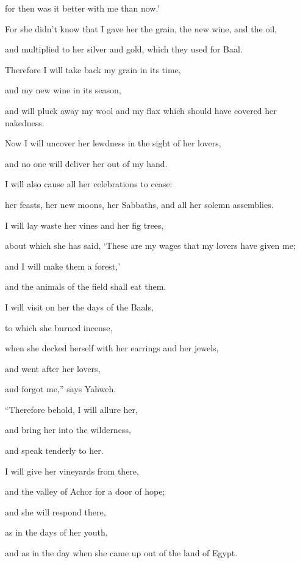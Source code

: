 {\par }{\QB for then was it better with me than now.’
\par }{\Q {}For she didn’t know that I gave her the grain, the new wine, and the oil,
\par }{\QB and multiplied to her silver and gold, which they used for Baal.
\par }{\Q {}Therefore I will take back my grain in its time,
\par }{\QB and my new wine in its season,
\par }{\QB and will pluck away my wool and my flax which should have covered her nakedness.
\par }{\Q {}Now I will uncover her lewdness in the sight of her lovers,
\par }{\QB and no one will deliver her out of my hand.
\par }{\Q {}I will also cause all her celebrations to cease:
\par }{\QB her feasts, her new moons, her Sabbaths, and all her solemn assemblies.
\par }{\Q {}I will lay waste her vines and her fig trees,
\par }{\QB about which she has said, ‘These are my wages that my lovers have given me;
\par }{\QB and I will make them a forest,’
\par }{\QB and the animals of the field shall eat them.
\par }{\Q {}I will visit on her the days of the Baals,
\par }{\QB to which she burned incense,
\par }{\Q when she decked herself with her earrings and her jewels,
\par }{\QB and went after her lovers,
\par }{\QB and forgot me,” says Yahweh.
\par }{\Q {}“Therefore behold, I will allure her,
\par }{\QB and bring her into the wilderness,
\par }{\QB and speak tenderly to her.
\par }{\Q {}I will give her vineyards from there,
\par }{\QB and the valley of Achor for a door of hope;
\par }{\Q and she will respond there,
\par }{\QB as in the days of her youth,
\par }{\QB and as in the day when she came up out of the land of Egypt.
}
